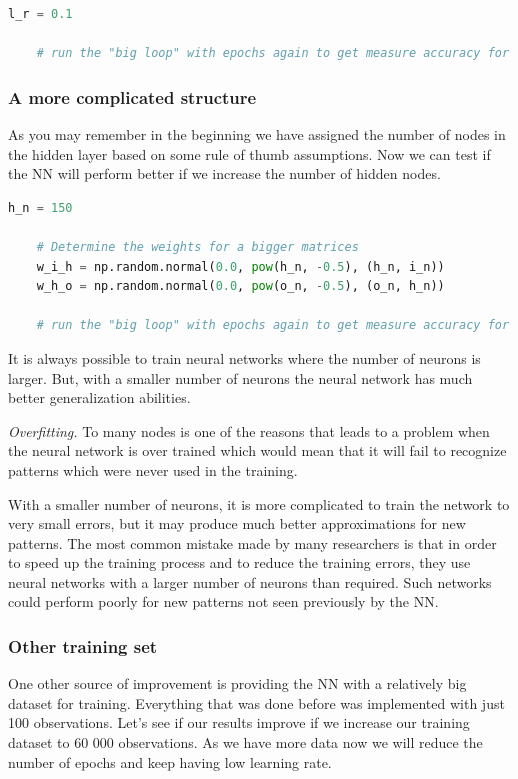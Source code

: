 \begin{lstlisting}[language=Python]   
    l_r = 0.1

    # run the "big loop" with epochs again to get measure accuracy for new settings.
\end{lstlisting}

\subsubsection{A more complicated structure}

As you may remember in the beginning we have assigned the number of nodes in the hidden layer based on some rule of thumb assumptions. Now we can test if the NN will perform better if we increase the number of hidden nodes.

\begin{lstlisting}[language=Python]   
    h_n = 150
    
    # Determine the weights for a bigger matrices
    w_i_h = np.random.normal(0.0, pow(h_n, -0.5), (h_n, i_n))
    w_h_o = np.random.normal(0.0, pow(o_n, -0.5), (o_n, h_n))
    
    # run the "big loop" with epochs again to get measure accuracy for new settings.
\end{lstlisting}

It is always possible to train neural networks where the number of neurons is larger. But, with a smaller number of neurons the neural network has much better generalization abilities. 

\textit{Overfitting.} To many nodes is one of the reasons that leads to a problem when the neural network is over trained which would mean that it will fail to recognize patterns which were never used in the training.

With a smaller number of neurons, it is more complicated to train the network to very small errors, but it may produce much better approximations for new patterns. The most common mistake made by many researchers is that in order to speed up the training process and to reduce the training errors, they use neural networks with a larger number of neurons than required. Such networks could perform poorly for new patterns not seen previously by the NN.

\subsubsection{Other training set}

One other source of improvement is providing the NN with a relatively big dataset for training. Everything that was done before was implemented with just 100 observations. Let's see if our results improve if we increase our training dataset to 60 000 observations. As we have more data now we will reduce the number of epochs and keep having low learning rate.

